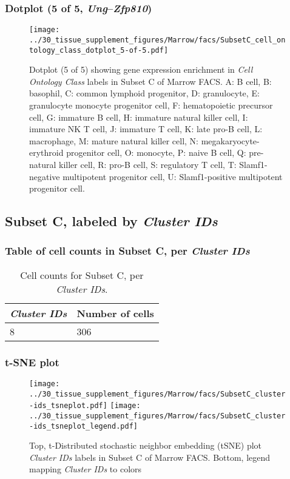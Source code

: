 \subsubsection{Dotplot (5 of 5, \emph{Ung}--\emph{Zfp810})}
\begin{figure}[h]
\centering
\texttt{[image: ../30\_tissue\_supplement\_figures/Marrow/facs/SubsetC\_cell\_ontology\_class\_dotplot\_5-of-5.pdf]}

\caption{ Dotplot (5 of 5)  showing gene expression enrichment in \emph{Cell Ontology Class} labels in Subset C of Marrow FACS. A: B cell, B: basophil, C: common lymphoid progenitor, D: granulocyte, E: granulocyte monocyte progenitor cell, F: hematopoietic precursor cell, G: immature B cell, H: immature natural killer cell, I: immature NK T cell, J: immature T cell, K: late pro-B cell, L: macrophage, M: mature natural killer cell, N: megakaryocyte-erythroid progenitor cell, O: monocyte, P: naive B cell, Q: pre-natural killer cell, R: pro-B cell, S: regulatory T cell, T: Slamf1-negative multipotent progenitor cell, U: Slamf1-positive multipotent progenitor cell.}
\end{figure}


\clearpage

\subsection{Subset C, labeled by \emph{Cluster IDs}}
\subsubsection{Table of cell counts in Subset C, per \emph{Cluster IDs}}\begin{table}[h]
\centering
\label{my-label}
\begin{tabular}{@{}ll@{}}
\toprule

\emph{Cluster IDs}& Number of cells \\ \midrule
8 & 306 \\
\bottomrule
\end{tabular}
\caption{Cell counts for Subset C, per \emph{Cluster IDs}.}
\end{table}

\clearpage
\subsubsection{t-SNE plot}
\begin{figure}[h]
\centering
\texttt{[image: ../30\_tissue\_supplement\_figures/Marrow/facs/SubsetC\_cluster-ids\_tsneplot.pdf]}
\texttt{[image: ../30\_tissue\_supplement\_figures/Marrow/facs/SubsetC\_cluster-ids\_tsneplot\_legend.pdf]}
\caption{Top, t-Distributed stochastic neighbor embedding (tSNE) plot  \emph{Cluster IDs} labels in Subset C of Marrow FACS. Bottom, legend mapping \emph{Cluster IDs} to colors}
\end{figure}


